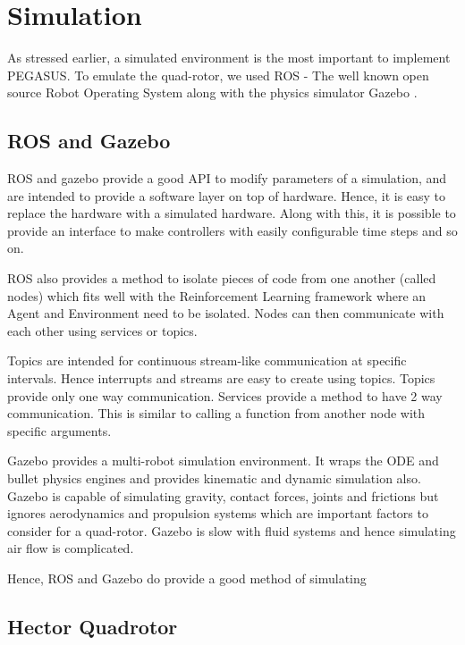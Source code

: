 \documentclass[BTech]{iitmdiss}
\begin{document}

\chapter{Simulation}

As stressed earlier, a simulated environment is the most important to implement PEGASUS. To emulate the quad-rotor, we used ROS \cite{ROS} - The well known open source Robot Operating System along with the physics simulator Gazebo \cite{Gazebo}.

\section{ROS and Gazebo}

ROS and gazebo provide a good API to modify parameters of a simulation, and are intended to provide a software layer on top of hardware. Hence, it is easy to replace the hardware with a simulated hardware. Along with this, it is possible to provide an interface to make controllers with easily configurable time steps and so on.

ROS also provides a method to isolate pieces of code from one another (called nodes) which fits well with the Reinforcement Learning framework where an Agent and Environment need to be isolated. Nodes can then communicate with each other using services or topics.

Topics are intended for continuous stream-like communication at specific intervals. Hence interrupts and streams are easy to create using topics. Topics provide only one way communication. Services provide a method to have 2 way communication. This is similar to calling a function from another node with specific arguments.

Gazebo provides a multi-robot simulation environment. It wraps the ODE and bullet physics engines and provides kinematic and dynamic simulation also. Gazebo is capable of simulating gravity, contact forces, joints and frictions but ignores aerodynamics and propulsion systems which are important factors to consider for a quad-rotor. Gazebo is slow with fluid systems and hence simulating air flow is complicated.

Hence, ROS and Gazebo do provide a good method of simulating

\section{Hector Quadrotor}
\end{document}

